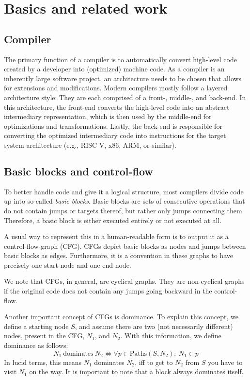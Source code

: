 \chapter{Basics and related work}\label{sec:basics}

\section{Compiler}\label{sec:basics:compiler}

The primary function of a compiler is to automatically convert high-level code created by a developer into (optimized) machine code.
As a compiler is an inherently large software project, an architecture needs to be chosen that allows for extensions and modifications.
Modern compilers mostly follow a layered architecture style: They are each comprised of a front-, middle-, and back-end.
In this architecture, the front-end converts the high-level code into an abstract intermediary representation, which is then used by the middle-end for optimizations and transformations.
Lastly, the back-end is responsible for converting the optimized intermediary code into instructions for the target system architecture (e.g., RISC-V, x86, ARM, or similar).

\section{Basic blocks and control-flow}\label{sec:basics:bb-cf}

To better handle code and give it a logical structure, most compilers divide code up into so-called \textit{basic blocks}.
Basic blocks are sets of consecutive operations that do not contain jumps or targets thereof, but rather only jumps connecting them.
Therefore, a basic block is either executed entirely or not executed at all.

A usual way to represent this in a human-readable form is to output it as a control-flow-graph (CFG).
CFGs depict basic blocks as nodes and jumps between basic blocks as edges.
Furthermore, it is a convention in these graphs to have precisely one start-node and one end-node.

We note that CFGs, in general, are cyclical graphs.
They are non-cyclical graphs if the original code does not contain any jumps going backward in the control-flow.

Another important concept of CFGs is dominance.
To explain this concept, we define a starting node $S$, and assume there are two (not necessarily different) nodes, present in the CFG, $N_1$, and $N_2$.
With this information, we define dominance as follows:
$$N_1~\text{dominates}~N_2 \Longleftrightarrow \forall p \in \text{Paths}(S, N_2):~N_1 \in p$$
In lucid terms, this means $N_1$ dominates $N_2$, iff to get to $N_2$ from $S$ you have to visit $N_1$ on the way.
It is important to note that a block always dominates itself.

